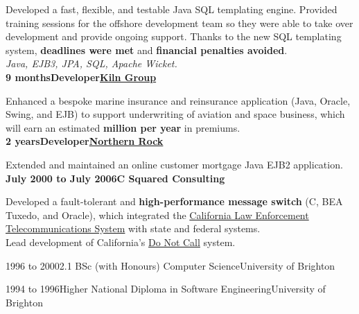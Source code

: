 \documentclass[a4paper,12pt]{article}
\newcommand{\head}[1]{\needspace{6em}\begin{center}{\large{\textbf{\sc{#1}}}}\nopagebreak\end{center}}
\newcommand{\jobheld}[2]{\textbf{#1\hfill #2}\nopagebreak}
\newcommand{\clientwork}[3]{\textbf{#1\hfill#3\hfill#2}\nopagebreak}
\newcommand{\tab}{\hspace{2em}}
\newcommand{\education}[3]{#1\tab#2\hfill#3}
\newcommand{\techstack}[1]{\textit{#1}}
\begin{document}
Developed a fast, flexible, and testable Java SQL templating engine. Provided training sessions for the offshore development team so they were able to take over development and provide ongoing support. Thanks to the new SQL templating system, \textbf{deadlines were met} and \textbf{financial penalties avoided}. \\

\techstack{Java, EJB3, JPA, SQL, Apache Wicket.}\\

\clientwork{9 months}{\href{http://www.tokiomarinekiln.com/}{Kiln Group}}{Developer}

Enhanced a bespoke marine insurance and reinsurance application (Java, Oracle, Swing, and EJB) to support underwriting of aviation and space business, which will earn an estimated \textbf{ million per year} in premiums.\\

\clientwork{2 years}{\href{http://www.northernrock.co.uk}{Northern Rock}}{Developer}

Extended and maintained an online customer mortgage Java EJB2 application.\\

\jobheld{July 2000 to July 2006}{C Squared Consulting}

Developed a fault-tolerant and \textbf{high-performance message switch} (C, BEA Tuxedo, and Oracle), which integrated the \href{http://definitions.uslegal.com/c/clets/}{California Law Enforcement Telecommunications System} with state and federal systems.\\

Lead development of California's \href{http://www.sfgate.com/cgi-bin/article.cgi?f=/c/a/2003/03/31/MN5478.DTL}{Do Not Call} system.\\

\head{Education}

\education{1996 to 2000}{2.1 BSc (with Honours) Computer Science}{University of Brighton}

\education{1994 to 1996}{Higher National Diploma in Software Engineering}{University of Brighton}
\end{document}
